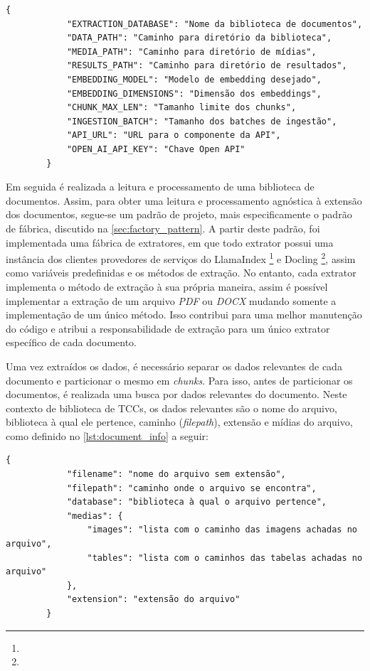\documentclass[a4paper, 12pt]{article}
\begin{document}
    \begin{lstlisting}[caption={Objeto com os parâmetros da configuração de ambiente do pipeline de ingestão.}, label={lst:env_params}]
        {
            "EXTRACTION_DATABASE": "Nome da biblioteca de documentos",
            "DATA_PATH": "Caminho para diretório da biblioteca",
            "MEDIA_PATH": "Caminho para diretório de mídias",
            "RESULTS_PATH": "Caminho para diretório de resultados",
            "EMBEDDING_MODEL": "Modelo de embedding desejado",
            "EMBEDDING_DIMENSIONS": "Dimensão dos embeddings",
            "CHUNK_MAX_LEN": "Tamanho limite dos chunks",
            "INGESTION_BATCH": "Tamanho dos batches de ingestão",
            "API_URL": "URL para o componente da API",
            "OPEN_AI_API_KEY": "Chave Open API"
        }
    \end{lstlisting}
    
    Em seguida é realizada a leitura e processamento de uma biblioteca de documentos. Assim, para obter uma leitura e processamento agnóstica à extensão dos documentos, segue-se  um padrão de projeto, mais especificamente o padrão de fábrica, discutido na \autoref{sec:factory_pattern}. A partir deste padrão, foi implementada uma fábrica de extratores, em que todo extrator possui uma instância dos clientes provedores de serviços do LlamaIndex \footnote{} e Docling \footnote{}, assim como variáveis predefinidas e os métodos de extração. No entanto, cada extrator implementa o método de extração à sua própria maneira, assim é possível implementar a extração de um arquivo \textit{PDF} ou \textit{DOCX} mudando somente a implementação de um único método. Isso contribui para uma melhor manutenção do código e atribui a responsabilidade de extração para um único extrator específico de cada documento.

    Uma vez extraídos os dados, é necessário separar os dados relevantes de cada documento e particionar o mesmo em \textit{chunks}. Para isso, antes de particionar os documentos, é realizada uma busca por dados relevantes do documento. Neste contexto de biblioteca de TCCs, os dados relevantes são o nome do arquivo, biblioteca à qual ele pertence, caminho (\textit{filepath}), extensão e mídias do arquivo, como definido no \autoref{lst:document_info} a seguir:
    
    \begin{lstlisting}[caption={Objeto com dados mais superficiais do documento.}, label={lst:document_info}]
        {
            "filename": "nome do arquivo sem extensão",
            "filepath": "caminho onde o arquivo se encontra",
            "database": "biblioteca à qual o arquivo pertence",
            "medias": {
                "images": "lista com o caminho das imagens achadas no arquivo",
                "tables": "lista com o caminhos das tabelas achadas no arquivo"
            },
            "extension": "extensão do arquivo"
        }
    \end{lstlisting}
    
\end{document}
